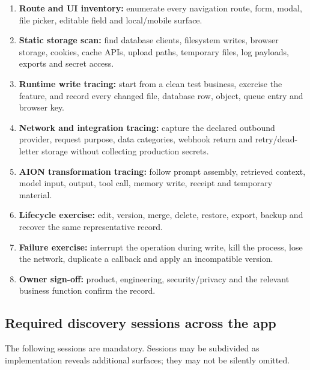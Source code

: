 \documentclass[11pt]{article}
\begin{document}
\begin{enumerate}
  \item \textbf{Route and UI inventory:} enumerate every navigation route, form, modal, file picker, editable field and local/mobile surface.
  \item \textbf{Static storage scan:} find database clients, filesystem writes, browser storage, cookies, cache APIs, upload paths, temporary files, log payloads, exports and secret access.
  \item \textbf{Runtime write tracing:} start from a clean test business, exercise the feature, and record every changed file, database row, object, queue entry and browser key.
  \item \textbf{Network and integration tracing:} capture the declared outbound provider, request purpose, data categories, webhook return and retry/dead-letter storage without collecting production secrets.
  \item \textbf{AION transformation tracing:} follow prompt assembly, retrieved context, model input, output, tool call, memory write, receipt and temporary material.
  \item \textbf{Lifecycle exercise:} edit, version, merge, delete, restore, export, backup and recover the same representative record.
  \item \textbf{Failure exercise:} interrupt the operation during write, kill the process, lose the network, duplicate a callback and apply an incompatible version.
  \item \textbf{Owner sign-off:} product, engineering, security/privacy and the relevant business function confirm the record.
\end{enumerate}

\subsection{Required discovery sessions across the app}

The following sessions are mandatory. Sessions may be subdivided as implementation reveals additional surfaces; they may not be silently omitted.
\end{document}
